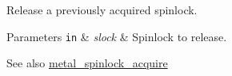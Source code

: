 Release a previously acquired spinlock. 


\begin{DoxyParams}[1]{Parameters}
\mbox{\tt in}  & {\em slock} & Spinlock to release. \\
\hline
\end{DoxyParams}
\begin{DoxySeeAlso}{See also}
\hyperlink{group__spinlock_gab95ccf0f56b35afe3be1406ffa7b4943}{metal\+\_\+spinlock\+\_\+acquire} 
\end{DoxySeeAlso}
